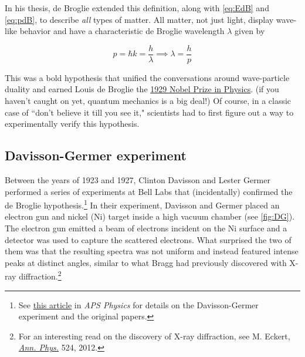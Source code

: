In his thesis, de Broglie extended this definition, along with \autoref{eq:EdB} and \ref{eq:pdB}, to describe \emph{all} types of matter. 
All matter, not just light, display wave-like behavior and have a characteristic de Broglie wavelength $\lambda$ given by

\begin{tcolorbox}[title=de Broglie wavelength] \vspace{-2ex}
	\begin{equation}
		p = \hbar k = \frac{h}{\lambda} \implies \lambda = \frac{h}{p} \label{eq:dBw}
	\end{equation}
\end{tcolorbox}

This was a bold hypothesis that unified the conversations around wave-particle duality and earned Louis de Broglie the \href{https://www.nobelprize.org/prizes/physics/1929/summary/}{1929 Nobel Prize in Physics}. 
(if you haven't caught on yet, quantum mechanics is a big deal!)
Of course, in a classic case of ``don't believe it till you see it," scientists had to first figure out a way to experimentally verify this hypothesis.


\subsection{Davisson-Germer experiment}

Between the years of 1923 and 1927, Clinton Davisson and Lester Germer performed a series of experiments at Bell Labs that (incidentally) confirmed the de Broglie hypothesis.\footnote{See \href{https://physics.aps.org/story/v17/st17}{this article} in \emph{APS Physics} for details on the Davisson-Germer experiment and the original papers.} 
In their experiment, Davisson and Germer placed an electron gun and nickel (Ni) target inside a high vacuum chamber (see \autoref{fig:DG}). 
The electron gun emitted a beam of electrons incident on the Ni surface and a detector was used to capture the scattered electrons. 
What surprised the two of them was that the resulting spectra was not uniform and instead featured intense peaks at distinct angles, similar to what Bragg had previously discovered with X-ray diffraction.\footnote{For an interesting read on the discovery of X-ray diffraction, see M. Eckert, \href{http://onlinelibrary.wiley.com/doi/10.1002/andp.201200724/full}{\emph{Ann. Phys.}} 524, 2012.} 

